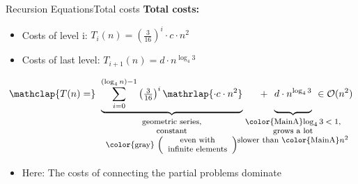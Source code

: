 \begin{frame}{Recursion Equations}{Total costs}
  \textbf{Total costs:}
  \begin{itemize}
    \item<2->
      Costs of {\color{MainA}level i}:
      $T_i(n) = \left(\frac{3}{16}\right)^i \cdot c \cdot n^2$
    \item<3->
      Costs of {\color{MainA}last level}:
      $T_{i+1}(n) = d \cdot n^{\log_4 3}$
  \end{itemize}
  \vspace{0.5em}
  \begin{displaymath}
    \mathclap{T(n) =}\underbrace{
      \sum\limits_{i = 0}^{(\log_4 n) - 1} \left(\tfrac{3}{16}\right)^i
      \mathrlap{\cdot c \cdot n^2}
    }_{
      \text{
        \footnotesize
        \begin{tabular}{c}
          geometric series,\\
          constant\\
          \color{gray}
          $\left(\begin{array}{c}
            \text{even with}\\
            \text{infinite elements}
          \end{array}\right)$
        \end{tabular}
      }
    } \hspace{1.25em} + \hspace{0.5em} \underbrace{
      d \cdot n^{\log_4 3}
      \vphantom{\sum\limits_{i = 0}^{(\log_4 n) - 1}}
    }_{
      \text{
        \makebox[0pt][c]{
          \footnotesize
          \begin{tabular}{c}
            {\color{MainA}$\log_4 3 < 1$},\\
            grows a lot\\
            slower than {\color{MainA}$n^2$}
          \end{tabular}
        }
      }
    } ~ \in \mathcal{O}(n^2)
  \end{displaymath}
  \begin{itemize}
    \item<5->
      Here: The costs of connecting the partial problems dominate
  \end{itemize}
\end{frame}


